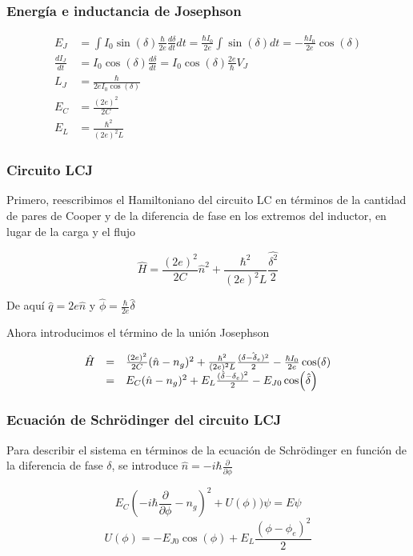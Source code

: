 \documentclass[xetex,mathserif,serif]{beamer}
\begin{document}
\begin{frame}
    \frametitle{Energía e inductancia de Josephson}

     \begin{align}
         E_J &= \int I_0 \sin(\delta) \frac{\hbar}{2e} \frac{d\delta}{dt} dt
         = \frac{\hbar I_0}{2e} \int \sin(\delta) dt
         = - \frac{\hbar I_0}{2e} \cos(\delta) \\
         \frac{dI_J}{dt} &= I_0 \cos(\delta) \frac{d \delta}{dt} = I_0 \cos(\delta)
          \frac{2e}{\hbar} V_J \\
         L_J &= \frac{\hbar}{2e I_0 \cos(\delta)} \\
         E_C &= \frac{(2e)^2}{2C} \\
         E_L &= \frac{\hbar^2}{(2e)^2L}
     \end{align}

\end{frame}

\begin{frame}
    \frametitle{Circuito LCJ}

\justify
Primero, reescribimos el Hamiltoniano del circuito LC en términos de la
cantidad de pares de Cooper y de la diferencia de fase en los extremos
del inductor, en lugar de la carga y el flujo

\begin{equation}
    \hat{H} = \frac{(2e)^2}{2C} \hat{n}^2 + \frac{\hbar^2}{(2e)^2L} 
 \frac{\hat{\delta^2}}{2}
\end{equation}

De aquí $\hat{q}=2e\hat{n}$ y $\hat{\phi}=\frac{\hbar}{2e}\hat{\delta}$

Ahora introducimos el término de la unión Josephson

\begin{equation}
    \begin{array}{r c l}
        \hat{H} &=& \frac{(2e)^2}{2C} (\hat{n}-n_g)^2 + \frac{\hbar^2}{(2e)^2L} 
 \frac{\hat{(\delta-\delta_e)^2}}{2} - \frac{\hbar I_0}{2e} \cos(\delta) \\
 &=& E_C (\hat{n}-n_g)^2 + E_L \frac{(\hat{\delta}-\delta_e)^2}{2}
 - E_{J0} \cos(\hat{\delta})
     \end{array}
\end{equation}

\end{frame}

\begin{frame}
    \frametitle{Ecuación de Schrödinger del circuito LCJ}

\justify
Para describir el sistema en términos de la ecuación de Schrödinger en
función de la diferencia de fase $\delta$, se introduce $\hat{n}=-i\hbar
\frac{\partial}{\partial \phi}$

$$E_C (-i\hbar \frac{\partial}{\partial\phi}-n_g)^2+U(\phi))\psi = E \psi$$
$$U(\phi) = -E_{J0} \cos(\phi)+E_L \frac{(\phi-\phi_e)^2}{2}$$

\end{frame}
\end{document}
